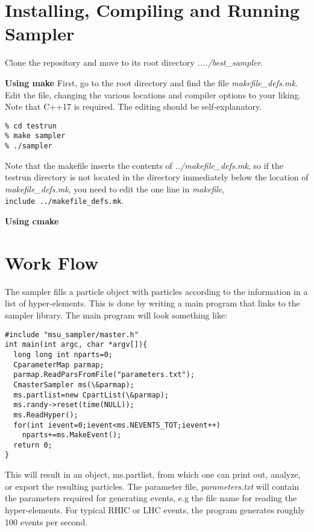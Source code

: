 



\section{Installing, Compiling and Running Sampler}

Clone the repository and move to its root directory {\it ..../best\_sampler}.

{\bf Using make}
First, go to the root directory and find the file {\it makefile\_defs.mk}. Edit the file, changing the various locations and compiler options to your liking. Note that C++17 is required. The editing should be self-explanatory.
{\tt\begin{verbatim}
% cd testrun
% make sampler
% ./sampler
\end{verbatim}}
Note that the makefile inserts the contents of {\it ../makefile\_defs.mk}, so if the testrun directory is not located in the directory immediately below the location of {\it makefile\_defs.mk}, you need to edit the one line in {\it makefile},\\
{\tt include ../makefile\_defs.mk}.

{\bf Using cmake}

\section{Work Flow}

The sampler fills a particle object with particles according to the information in a list of hyper-elements. This is done by writing a main program that links to the sampler library. The main program will look something like:

{\tt \begin{verbatim}
#include "msu_sampler/master.h"
int main(int argc, char *argv[]){
  long long int nparts=0;
  CparameterMap parmap;
  parmap.ReadParsFromFile("parameters.txt");
  CmasterSampler ms(\&parmap);
  ms.partlist=new CpartList(\&parmap);
  ms.randy->reset(time(NULL));
  ms.ReadHyper();
  for(int ievent=0;ievent<ms.NEVENTS_TOT;ievent++)
    nparts+=ms.MakeEvent();
  return 0;
}
\end{verbatim}}
This will result in an object, ms.partlist, from which one can print out, analyze, or export the resulting particles. The parameter file, {\it parameters.txt} will contain the parameters required for generating events, e.g the file name for reading the hyper-elements. For typical RHIC or LHC events, the program generates roughly 100 events per second. 

